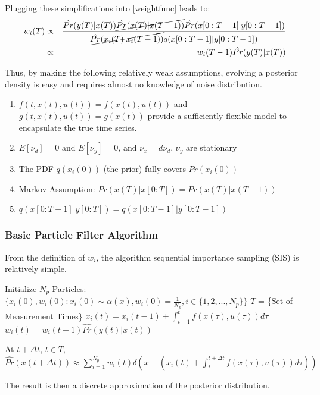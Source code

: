 \documentclass{article}
\begin{document}
Plugging these simplifications into \eqref{weightfunc} leads to:
\begin{eqnarray}
\label{weightevolve}
w_i(T) & \propto & \frac{\hat{Pr}(y(T)| x(T)) \cancel{\hat{Pr}(x(T) | x(T-1))} \hat{Pr}(x[0:T-1] | y[0:T-1])}
                         {\cancel{\hat{Pr}(x_i(T) | x_i(T-1))}q(x[0:T-1] | y[0:T-1])} \nonumber \\
& \propto & w_i(T-1)\hat{Pr}(y(T)| x(T)) 
\end{eqnarray}

Thus, by making the following relatively weak assumptions, evolving a posterior
density  is easy and requires almost no knowledge of noise distribution.
\begin{enumerate}
\item $f(t, x(t), u(t)) = f(x(t), u(t))$ and $g(t, x(t), u(t)) = g(x(t))$ provide 
a sufficiently flexible model to encapsulate the true time series.
\item $E[\nu_d] = 0$ and $E[\nu_y] = 0$, and $\nu_x = d\nu_d$, $\nu_y$ are stationary
\item The PDF $q(x_i(0))$ (the prior) fully covers $Pr(x_i(0))$
\item Markov Assumption: $Pr(x(T) | x[0:T]) = Pr(x(T) | x(T-1))$
\item $q(x[0:T-1] | y[0:T]) = q(x[0:T-1] | y[0:T-1])$
\end{enumerate}

\subsubsection{Basic Particle Filter Algorithm}
From the definition of $w_i$, the algorithm sequential importance sampling (SIS) 
is relatively simple. 

\begin{algorithmic}
\STATE Initialize $N_p$ Particles: 
        $\{x_i(0),w_i(0) : x_i(0) \sim \alpha(x), w_i(0) = \frac{1}{N_p}, i \in \{1, 2, ... , N_p\} \}$
\STATE $T$ = \{Set of Measurement Times\}
        \STATE $x_i(t) = x_i(t-1) + \int_{t-1}^t f(x(\tau), u(\tau)) d\tau $
        \STATE $w_i(t) = w_i(t-1)\hat{Pr}(y(t) | x(t))$
    \ENDFOR
\ENDFOR

\STATE At $t + \Delta t$, $t \in T$, $\hat{Pr}(x(t+\Delta t)) \approx 
\sum_{i=1}^{N_p} w_i(t)\delta\left(x - (x_i(t) + \int_t^{t+\Delta t} f(x(\tau), u(\tau)) d\tau) \right)$
\end{algorithmic}
The result is then a discrete approximation of the posterior distribution. 
\end{document}
